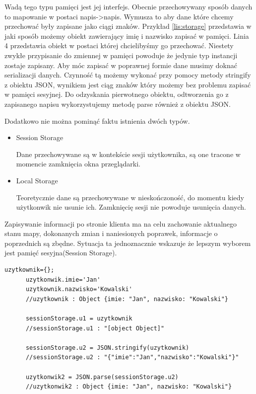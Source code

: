 Wadą tego typu pamięci jest jej interfejs. Obecnie przechowywany sposób danych to mapowanie w postaci napis->napis. Wymusza to aby dane które chcemy przechować były zapisane jako ciągi znaków. Przykład \ref{lis:storage} przedstawia w jaki sposób możemy obiekt zawierający imię i nazwisko zapisać w pamięci. Linia 4 przedstawia obiekt w postaci której chcielibyśmy go przechować. Niestety zwykłe przypisanie do zmiennej w pamięci powoduje że jedynie typ instancji zostaje zapisany. Aby móc zapisać w poprawnej formie dane musimy doknać serializacji danych. Czynność tą możemy wykonać przy pomocy metody stringify z obiektu JSON, wynikiem jest ciąg znaków który możemy bez problemu zapisać w pamięci sesyjnej. Do odzyskania pierwotnego obiektu, odtworzenia go z zapisanego napisu wykorzystujemy metodę parse również z obiektu JSON.

Dodatkowo nie można pominąć faktu istnienia dwóch typów.
\begin{itemize}

\item
Session Storage

Dane przechowywane są w kontekście sesji użytkownika, są one tracone w momencie zamknięcia okna przeglądarki.

\item
Local Storage

Teoretycznie dane są przechowywane w nieskończoność, do momentu kiedy użytkonwik nie usunie ich. Zamknięcię sesji nie powoduje usunięcia danych.

\end{itemize}

Zapisywanie informacji po stronie klienta ma na celu zachowanie aktualnego stanu mapy, dokonanych zmian i naniesionych poprawek, informacje o poprzednich są zbędne. Sytuacja ta jednoznacznie wskazuje że lepszym wyborem jest pamięć sesyjna(Session Storage).

\lstset{language=JavaScript}
\label{lis:storage}
\begin{lstlisting}[caption=json]
      uzytkownik={};
      uzytkonwik.imie='Jan'
      uzytkownik.nazwisko='Kowalski'
      //uzytkownik : Object {imie: "Jan", nazwisko: "Kowalski"}

      sessionStorage.u1 = uzytkownik
      //sessionStorage.u1 : "[object Object]"

      sessionStorage.u2 = JSON.stringify(uzytkownik)
      //sessionStorage.u2 : "{"imie":"Jan","nazwisko":"Kowalski"}"

      uzytkonwik2 = JSON.parse(sessionStorage.u2)
      //uzytkonwik2 : Object {imie: "Jan", nazwisko: "Kowalski"}
\end{lstlisting}


